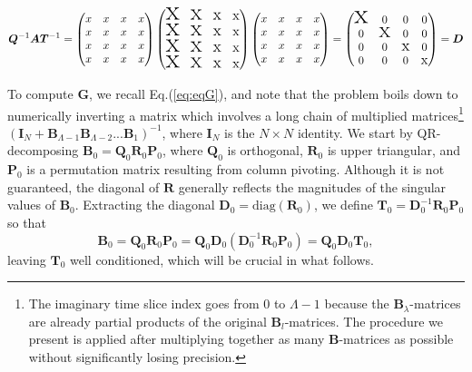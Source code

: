 \begin{equation}
\bm Q^{-1} \bm A \bm T^{-1} =
\begin{pmatrix}
x & x & x & x \\
x & x & x & x \\
x & x & x & x \\ 
x & x & x & x 
\end{pmatrix}
\begin{pmatrix}
$$ \mbox{\Huge x} $$ & $$ \mbox{\huge x} $$ & $$ \mbox{\Large x} $$ & $$ \mbox{\large x} $$\\
$$ \mbox{\Huge x} $$ & $$ \mbox{\huge x} $$ & $$ \mbox{\Large x} $$ & $$ \mbox{\large x} $$ \\
$$ \mbox{\Huge x} $$ & $$ \mbox{\huge x} $$ & $$ \mbox{\Large x} $$ & $$ \mbox{\large x} $$ \\ 
$$ \mbox{\Huge x} $$ & $$ \mbox{\huge x} $$ & $$ \mbox{\Large x} $$ & $$ \mbox{\large x} $$
\end{pmatrix}
\begin{pmatrix}
x & x & x & x \\
x & x & x & x \\
x & x & x & x \\ 
x & x & x & x 
\end{pmatrix} = 
\begin{pmatrix}
$$ \mbox{\Huge x} $$ & 0 & 0 & 0 \\
0 & $$ \mbox{\huge x} $$ & 0 & 0 \\
0 & 0 & $$ \mbox{\Large x} $$ & 0 \\ 
0 & 0 & 0 & $$ \mbox{\large x} $$
\end{pmatrix} = \bm D
\end{equation}

To compute $\bm G$, we recall Eq.(\ref{eq:eqG}), and note that the problem boils down to numerically inverting a matrix which involves a long chain of multiplied matrices\footnote{The imaginary time slice index goes from 0 to $\Lambda - 1$ because the $\bm B_\lambda$-matrices are already partial products of the original $\bm B_l$-matrices.
The procedure we present is applied after multiplying together as many $\bm B$-matrices as possible without significantly losing precision.} $(\bm I_N + \bm B_{\Lambda-1} \bm B_{\Lambda-2} ... \bm B_1)^{-1}$, where $\bm I_N$ is the $N \times N$ identity.
We start by QR-decomposing $\bm B_0 = \bm Q_0 \bm R_0 \bm P_0$, where $\bm Q_0$ is orthogonal, $\bm R_0$ is upper triangular, and $\bm P_0$ is a permutation matrix resulting from column pivoting.
Although it is not guaranteed, the diagonal of $\bm R$ generally reflects the magnitudes of the singular values of $\bm B_0$.
Extracting the diagonal $\bm D_0 = \text{diag} ( \bm R_0 )$, we define $\bm T_0 = \bm D_0^{-1} \bm R_0 \bm P_0$ so that
\begin{equation}
\bm B_0 = \bm Q_0 \bm R_0 \bm P_0 = \bm Q_0 \bm D_0 ( \bm D_0^{-1} \bm R_0 \bm P_0 ) = \bm Q_0 \bm D_0 \bm T_0 ,
\end{equation}
leaving $\bm T_0$ well conditioned, which will be crucial in what follows.

